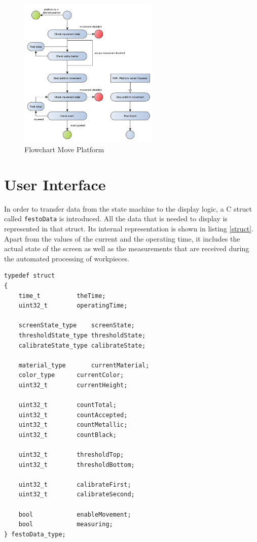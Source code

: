 \begin{figure}[H]
	\begin{center}
		\includegraphics[width=0.6\textwidth]{media/Flow_Chart_MovePlatform.pdf} 	
		\caption{Flowchart Move Platform}
		\label{fig:moveplatform}
	\end{center}
\end{figure}



\section{User Interface} %

In order to transfer data from the state machine to the display logic, a C struct called \texttt{festoData} is introduced. All the data that is needed to display is represented in that struct. Its internal representation is shown in listing \ref{struct}. Apart from the values of the current and the operating time, it includes the actual state of the screen as well as the measurements that are received during the automated processing of workpieces.

\begin{lstlisting}[label=struct, caption=festoData struct, style=customc]
typedef struct
{
	time_t 			theTime;
	uint32_t 		operatingTime;
	
	screenState_type 	screenState;
	thresholdState_type	thresholdState;
	calibrateState_type	calibrateState;
	
	material_type 		currentMaterial;
	color_type 		currentColor;
	uint32_t 		currentHeight;
	
	uint32_t		countTotal;
	uint32_t 		countAccepted;
	uint32_t 		countMetallic;
	uint32_t 		countBlack;
	
	uint32_t 		thresholdTop;
	uint32_t 		thresholdBottom;
	
	uint32_t 		calibrateFirst;
	uint32_t 		calibrateSecond;
	
	bool 			enableMovement;
	bool 			measuring;
} festoData_type;
\end{lstlisting}


